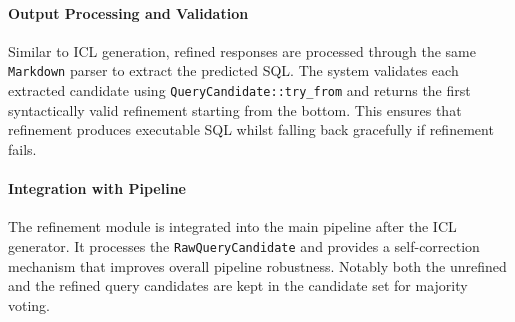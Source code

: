 \paragraph{Output Processing and Validation}

Similar to ICL generation, refined responses are processed through the same
\texttt{Markdown} parser to extract the predicted SQL. The system validates each
extracted candidate using \texttt{QueryCandidate::try_from} and returns the first
syntactically valid refinement starting from the bottom. This ensures that
refinement produces executable SQL whilst falling back gracefully if refinement
fails.

\paragraph{Integration with Pipeline}

The refinement module is integrated into the main pipeline after the ICL
generator. It processes the \texttt{RawQueryCandidate} and provides a
self-correction mechanism that improves overall pipeline robustness. Notably both
the unrefined and the refined query candidates are kept in the candidate set
for majority voting.

